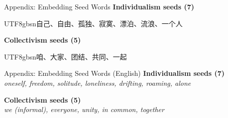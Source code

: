 \documentclass[aspectratio=169]{beamer}
\begin{document}
\begin{frame}[label=appendix-embedding-seeds]{Appendix: Embedding Seed Words}
\footnotesize
  \textbf{Individualism seeds (7)} \\
  \begin{CJK}{UTF8}{gbsn}自己、自由、孤独、寂寞、漂泊、流浪、一个人\end{CJK}

  \medskip
  \textbf{Collectivism seeds (5)} \\
  \begin{CJK}{UTF8}{gbsn}咱、大家、团结、共同、一起\end{CJK}

\vspace{0.4em}
\hyperlink{slide-embeddingmeasures}{}
\hfill
\hyperlink{appendix-embedding-seeds-en}{}
\end{frame}

\begin{frame}[label=appendix-embedding-seeds-en]{Appendix: Embedding Seed Words (English)}
\footnotesize
  \textbf{Individualism seeds (7)} \\
  \textit{oneself, freedom, solitude, loneliness, drifting, roaming, alone}

  \medskip
  \textbf{Collectivism seeds (5)} \\
  \textit{we (informal), everyone, unity, in common, together}

\vspace{0.4em}
\hyperlink{appendix-embedding-seeds}{}
\hfill
\hyperlink{slide-embeddingmeasures}{}
\end{frame}
\end{document}
